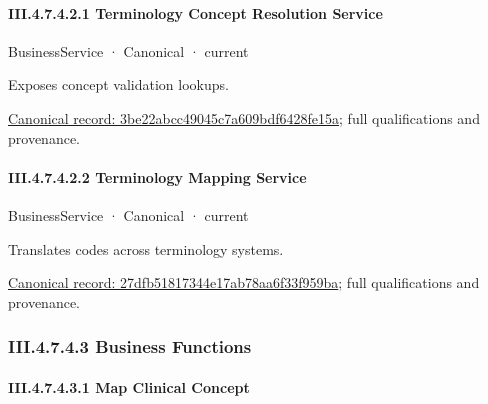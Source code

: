 \paragraph*{III.4.7.4.2.1 Terminology Concept Resolution Service}
\label{navigation:III.4.7.4.2.1}

\label{element:3be22abcc49045c7a609bdf6428fe15a}
{\small BusinessService · Canonical · current}\par

Exposes concept validation lookups.


{\footnotesize \href{../../../../../../../continuum/business/business-service/3be22abcc49045c7a609bdf6428fe15a.md}{Canonical record: 3be22abcc49045c7a609bdf6428fe15a}; full qualifications and provenance.}\par
\paragraph*{III.4.7.4.2.2 Terminology Mapping Service}
\label{navigation:III.4.7.4.2.2}

\label{element:27dfb51817344e17ab78aa6f33f959ba}
{\small BusinessService · Canonical · current}\par

Translates codes across terminology systems.


{\footnotesize \href{../../../../../../../continuum/business/business-service/27dfb51817344e17ab78aa6f33f959ba.md}{Canonical record: 27dfb51817344e17ab78aa6f33f959ba}; full qualifications and provenance.}\par
\subsubsection*{III.4.7.4.3 Business Functions}
\label{navigation:III.4.7.4.3}

\paragraph*{III.4.7.4.3.1 Map Clinical Concept}
\label{navigation:III.4.7.4.3.1}

